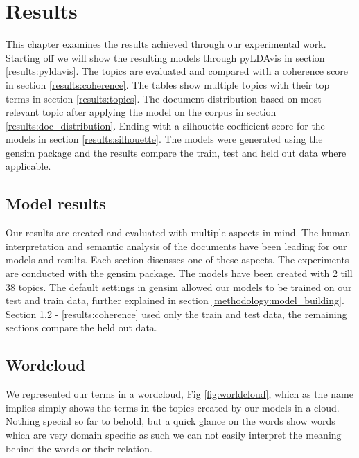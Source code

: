 \chapter{Results}
\label{ch:results}

This chapter examines the results achieved through our experimental work.
Starting off we will show the resulting models through pyLDAvis in section \ref{results:pyldavis}. The topics are evaluated and compared with a coherence score in section \ref{results:coherence}. The tables show multiple topics with their top terms in section \ref{results:topics}. The document distribution based on most relevant topic after applying the model on the corpus in section \ref{results:doc_distribution}. Ending with a silhouette coefficient score for the models in  section \ref{results:silhouette}. The models were generated using the gensim package and the results compare the train, test and held out data where applicable. 



\section{Model results}\label{results:modelresults}
Our results are created and evaluated with multiple aspects in mind. The human interpretation and semantic analysis of the documents have been leading for our models and results. Each section discusses one of these aspects. The experiments are conducted with the gensim package. The models have been created with 2 till 38 topics. The default settings in gensim allowed our models to be trained on our test and train data, further explained in section \ref{methodology:model_building}. Section \ref{results:wordcloud} - \ref{results:coherence} used only the train and test data, the remaining sections compare the held out data.

\FloatBarrier
\section{Wordcloud}\label{results:wordcloud}
We represented our terms in a wordcloud, Fig \ref{fig:worldcloud}, which as the name implies simply shows the terms in the topics created by our models in a cloud. Nothing special so far to behold, but a quick glance on the words show words which are very domain specific as such we can not easily interpret the meaning behind the words or their relation.

